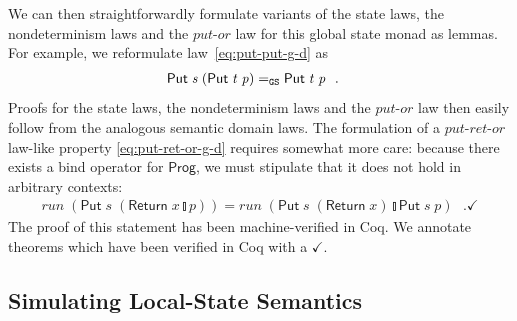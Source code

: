 \documentclass{llncs}
\newcommand{\Conid}[1]{\mathit{#1}}
\newcommand{\Varid}[1]{\mathit{#1}}
\let\Varid\mathit
\let\Conid\mathsf
\begin{document}
We can then straightforwardly formulate variants of the state laws, the
nondeterminism laws and the \ensuremath{\Varid{put}}-\ensuremath{\Varid{or}} law for this global state monad as
lemmas. For example, we reformulate law~\eqref{eq:put-put-g-d} as
\begin{align*}
  \ensuremath{\Conid{Put}\;\Varid{s}\;(\Conid{Put}\;\Varid{t}\;\Varid{p})} &\CEq \ensuremath{\Conid{Put}\;\Varid{t}\;\Varid{p}} \mbox{~~.}
\end{align*}
Proofs for the state laws, the nondeterminism laws and the \ensuremath{\Varid{put}}-\ensuremath{\Varid{or}} law then
easily follow from the analogous semantic domain laws. The formulation of a
\ensuremath{\Varid{put}}-\ensuremath{\Varid{ret}}-\ensuremath{\Varid{or}} law-like property \eqref{eq:put-ret-or-g-d} requires somewhat
more care: because there exists a bind operator for \ensuremath{\Conid{Prog}}, we must stipulate
that it does not hold in arbitrary contexts:
\begin{align}
\ensuremath{\Varid{run}\;(\Conid{Put}\;\Varid{s}\;(\Conid{Return}\;\Varid{x}\mathbin{\talloblong}\Varid{p}))} = \ensuremath{\Varid{run}\;(\Conid{Put}\;\Varid{s}\;(\Conid{Return}\;\Varid{x})\mathbin{\talloblong}\Conid{Put}\;\Varid{s}\;\Varid{p})} \label{eq:put-ret-or-g} \mbox{~~.} \checkmark
\end{align}
The proof of this statement has been machine-verified in Coq.
We annotate theorems which have been verified in Coq with a $\checkmark$.

\subsection{Simulating Local-State Semantics}
\end{document}

